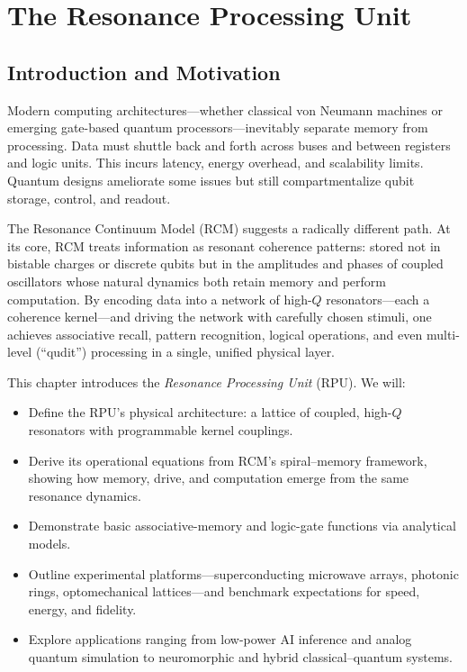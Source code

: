 \chapter{The Resonance Processing Unit}


\section{Introduction and Motivation}

Modern computing architectures—whether classical von Neumann machines or emerging gate-based quantum processors—inevitably separate memory from processing. Data must shuttle back and forth across buses and between registers and logic units. This incurs latency, energy overhead, and scalability limits. Quantum designs ameliorate some issues but still compartmentalize qubit storage, control, and readout.

The Resonance Continuum Model (RCM) suggests a radically different path. At its core, RCM treats information as resonant coherence patterns: stored not in bistable charges or discrete qubits but in the amplitudes and phases of coupled oscillators whose natural dynamics both retain memory and perform computation. By encoding data into a network of high-\(Q\) resonators—each a coherence kernel—and driving the network with carefully chosen stimuli, one achieves associative recall, pattern recognition, logical operations, and even multi-level (“qudit”) processing in a single, unified physical layer.

This chapter introduces the \emph{Resonance Processing Unit} (RPU).  We will:
\begin{itemize}
  \item Define the RPU’s physical architecture: a lattice of coupled, high-\(Q\) resonators with programmable kernel couplings.
  \item Derive its operational equations from RCM’s spiral–memory framework, showing how memory, drive, and computation emerge from the same resonance dynamics.
  \item Demonstrate basic associative-memory and logic-gate functions via analytical models.
  \item Outline experimental platforms—superconducting microwave arrays, photonic rings, optomechanical lattices—and benchmark expectations for speed, energy, and fidelity.
  \item Explore applications ranging from low-power AI inference and analog quantum simulation to neuromorphic and hybrid classical–quantum systems.
\end{itemize}

